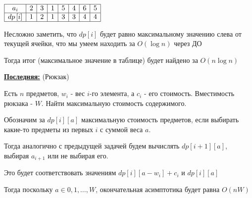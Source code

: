 \text{}

$\begin{array}{|c|c|c|c|c|c|c|c|}
\hline
     a_i & 2 & 3 & 1 & 5 & 4 & 6 & 5  \\
\hline
     dp\left[i\right] & 1 & 2 & 1 & 3 & 3 & 4 & 4\\
    \hline
\end{array}$

\text{}

Несложно заметить, что $dp\left[i\right]$ будет равно максимальному значению слева от текущей ячейки, что мы умеем находить за $O(\log{n})$ через ДО

Тогда итог (максимальное значение в таблице) будет найдено за $O(n \log{n})$

\underline{\textbf{Последняя:}} (Рюкзак)

Есть $n$ предметов, $w_i$ - вес $i$-го элемента, а $c_i$ - его стоимость. Вместимость рюкзака - $W$. Найти максимальную стоимость содержимого.

Обозначим за $dp\left[i\right]\left[a\right]$ максимальную стоимость предметов, если выбирать какие-то предметы из первых $i$ с суммой веса $a$.

Тогда аналогично с предыдущей задачей будем вычислять $dp\left[i+1\right]\left[a\right]$, выбирая $a_{i + 1}$ или не выбирая его.

Это будет соответствовать значениям $dp\left[i\right]\left[a - w_i\right] + c_i$ и $dp\left[i\right]\left[a\right]$

Тогда поскольку $a \in {0, 1, \dots, W}$, окончательная асимптотика будет равна $O(nW)$